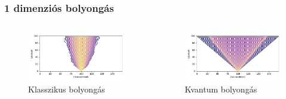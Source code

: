 \documentclass[aspectratio=169]{beamer}
\begin{document}
\begin{frame}
  \frametitle{1 dimenziós bolyongás}
  \begin{columns}[onlytextwidth]
    \begin{column}{.5\textwidth}
      \begin{figure}
        \includegraphics[width=\textwidth]{./figures/classical_simulation_short.jpg}
        \caption{\hspace{0.71cm}Klasszikus bolyongás}
      \end{figure}
    \end{column}
    \hfill
    \begin{column}{.5\textwidth}
      \begin{figure}
        \includegraphics[width=\textwidth]{./figures/quantum_simulation_short.jpg}
        \caption{\hspace{0.73cm}Kvantum bolyongás}
      \end{figure}
    \end{column}
  \end{columns}
\end{frame}
\end{document}
